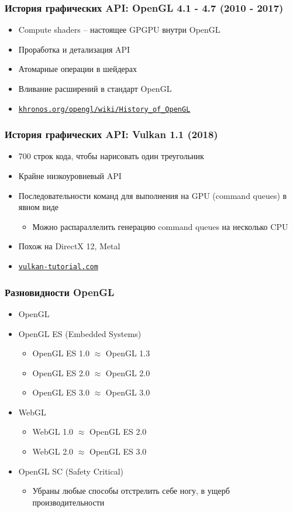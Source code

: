 \documentclass{beamer}
\begin{document}
\begin{frame}
\frametitle{История графических API: OpenGL 4.1 - 4.7 (2010 - 2017)}
\begin{itemize}
\item Compute shaders -- настоящее GPGPU внутри OpenGL
\item Проработка и детализация API
\item Атомарные операции в шейдерах
\item Вливание расширений в стандарт OpenGL
\item \href{https://khronos.org/opengl/wiki/History_of_OpenGL}{\nolinkurl{khronos.org/opengl/wiki/History\_of\_OpenGL}}
\end{itemize}
\end{frame}

\begin{frame}
\frametitle{История графических API: Vulkan 1.1 (2018)}
\begin{itemize}
\item 700 строк кода, чтобы нарисовать один треугольник
\pause
\item Крайне низкоуровневый API
\item Последовательности команд для выполнения на GPU (command queues) в явном виде
\begin{itemize}
\item Можно распараллелить генерацию command queues на несколько CPU
\end{itemize}
\pause
\item Похож на DirectX 12, Metal
\item \href{https://vulkan-tutorial.com}{\nolinkurl{vulkan-tutorial.com}}
\end{itemize}
\end{frame}

\begin{frame}
\frametitle{Разновидности OpenGL}
\begin{itemize}
\item OpenGL
\pause
\item OpenGL ES (Embedded Systems)
\begin{itemize}
\item OpenGL ES 1.0 $\approx$ OpenGL 1.3
\item OpenGL ES 2.0 $\approx$ OpenGL 2.0
\item OpenGL ES 3.0 $\approx$ OpenGL 3.0
\end{itemize}
\pause
\item WebGL
\begin{itemize}
\item WebGL 1.0 $\approx$ OpenGL ES 2.0
\item WebGL 2.0 $\approx$ OpenGL ES 3.0
\end{itemize}
\pause
\item OpenGL SC (Safety Critical)
\begin{itemize}
\item Убраны любые способы отстрелить себе ногу, в ущерб производительности
\end{itemize}
\end{itemize}
\end{frame}
\end{document}
